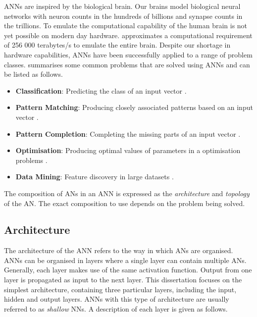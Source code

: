 \acp{ANN} are inspired by the biological brain. Our brains model biological neural networks with neuron counts in the hundreds of billions and synapse counts in the trillions. To emulate the computational capability of the human brain is not yet possible on modern day hardware. \citeauthor{ref:sandberg:2008} \cite{ref:sandberg:2008} approximates a computational requirement of 256 000 terabytes/s to emulate the entire brain. Despite our shortage in hardware capabilities, \acp{ANN} have been successfully applied to a range of problem classes. \citeauthor{ref:engelbrecht:2007} \cite{ref:engelbrecht:2007} summarises some common problems that are solved using \acp{ANN} and can be listed as follows.

\begin{itemize}
    \item \textbf{Classification}: Predicting the class of an input vector \cite{ref:khan:2001}.

    \item \textbf{Pattern Matching}: Producing closely associated patterns based on an input vector \cite{ref:cannady:1998, ref:kumar:1994}.

    \item \textbf{Pattern Completion}: Completing the missing parts of an input vector \cite{ref:dayhoff:2001}.

    \item \textbf{Optimisation}: Producing optimal values of parameters in a optimisation problems \cite{ref:specht:1991}.

    \item \textbf{Data Mining}: Feature discovery in large datasets \cite{ref:singh:2009}.
\end{itemize}

\noindent
The composition of \acp{AN} in an \ac{ANN} is expressed as the \textit{architecture} and \textit{topology} of the \ac{AN}. The exact composition to use depends on the problem being solved.

\subsection{Architecture} \label{sec:anns:anns:architecture}

The architecture of the \ac{ANN} refers to the way in which \acp{AN} are organised. \acp{ANN} can be organised in layers where a single layer can contain multiple \acp{AN}. Generally, each layer makes use of the same activation function. Output from one layer is propagated as input to the next layer. This dissertation focuses on the simplest architecture, containing three particular layers, including the input, hidden and output layers. \acp{ANN} with this type of architecture are usually referred to as \textit{shallow} \acp{NN}. A description of each layer is given as follows.

